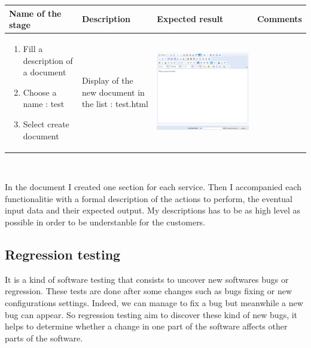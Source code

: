 \begin{itemize}
\begin{tabular}{|m{4cm}|m{3cm}|m{4cm}|m{2.1cm}|}
\hline
\textbf{Name of the stage} & \textbf{Description}
 & \textbf{Expected result} & \textbf{Comments} \\
\hline
\begin{enumerate}
	\item Fill a description of a document

	\item Choose a name : test

	\item Select create document 
\end{enumerate}&
Display of the new document in the list : test.html & 
\begin{minipage}{0.7\textwidth}
\includegraphics[scale=0.15]{Images/document.png} 
\end{minipage}& 
\\
\hline
\end{tabular}
\\
\end{itemize}

In the document I created one section for each service. Then I accompanied 
each functionalitie with a formal description of the actions to perform, 
the eventual input data and their expected output. 
My descriptions has to be as high level as possible in order to be understanble for the customers. 

\newpage
\subsection{Regression testing}
It is a kind of software testing that consists to uncover new softwares bugs
or regression. These tests are done after some changes such as bugs fixing
or new configurations settings. Indeed, we can manage to fix a bug but 
meanwhile a new bug can appear. So regression testing aim to discover these
kind of new bugs, it helps to determine whether a change in one part of the
 software affects other parts of the software.

